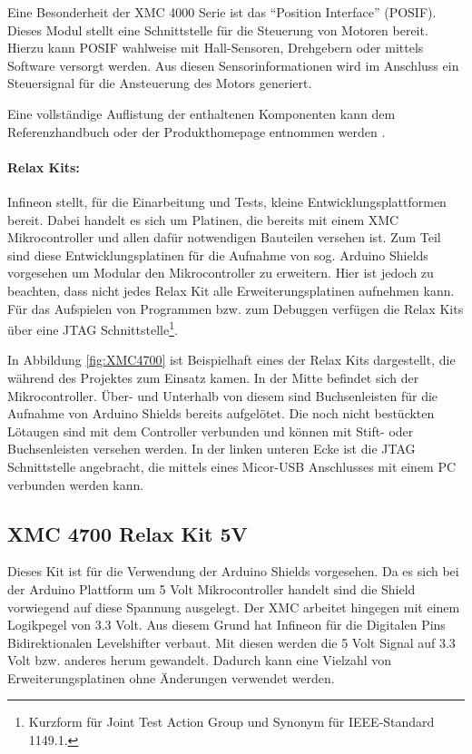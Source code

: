 Eine Besonderheit der XMC 4000 Serie ist das \enquote{Position Interface} (POSIF).
Dieses Modul stellt eine Schnittstelle für die Steuerung von Motoren bereit.
Hierzu kann POSIF wahlweise mit Hall-Sensoren, Drehgebern oder mittels Software versorgt werden.
Aus diesen Sensorinformationen wird im Anschluss ein Steuersignal für die Ansteuerung des Motors generiert.\cite{InfineonTechnologies2016a}

Eine vollständige Auflistung der enthaltenen Komponenten kann dem Referenzhandbuch \cite{InfineonTechnologies2016} oder der Produkthomepage \cite{InfineonTechnologies2017} entnommen werden .

\paragraph{Relax Kits:}
Infineon stellt, für die Einarbeitung und Tests, kleine Entwicklungsplattformen bereit.
Dabei handelt es sich um Platinen, die bereits mit einem XMC Mikrocontroller und allen dafür notwendigen Bauteilen versehen ist.
Zum Teil sind diese Entwicklungsplatinen für die Aufnahme von sog. Arduino Shields vorgesehen um Modular den Mikrocontroller zu erweitern.
Hier ist jedoch zu beachten, dass nicht jedes Relax Kit alle Erweiterungsplatinen aufnehmen kann.
Für das Aufspielen von Programmen bzw. zum Debuggen verfügen die Relax Kits über eine JTAG Schnittstelle\footnote{Kurzform für Joint Test Action Group und Synonym für IEEE-Standard 1149.1.}.

In Abbildung \ref{fig:XMC4700} ist Beispielhaft eines der Relax Kits dargestellt, die während des Projektes zum Einsatz kamen.
In der Mitte befindet sich der Mikrocontroller. 
Über- und Unterhalb von diesem sind Buchsenleisten für die Aufnahme von Arduino Shields bereits aufgelötet.
Die noch nicht bestückten Lötaugen sind mit dem Controller verbunden und können mit Stift- oder Buchsenleisten versehen werden.
In der linken unteren Ecke ist die JTAG Schnittstelle angebracht, die mittels eines Micor-USB Anschlusses mit einem PC verbunden werden kann. 

\subsection{XMC 4700 Relax Kit 5V}
\label{sec:XMC4700}
Dieses Kit ist für die Verwendung der Arduino Shields vorgesehen.
Da es sich bei der Arduino Plattform um 5 Volt Mikrocontroller handelt sind die Shield vorwiegend auf diese Spannung ausgelegt.
Der XMC arbeitet hingegen mit einem Logikpegel von 3.3 Volt.
Aus diesem Grund hat Infineon für die Digitalen Pins Bidirektionalen Levelshifter verbaut.
Mit diesen werden die 5 Volt Signal auf 3.3 Volt bzw. anderes herum gewandelt.
Dadurch kann eine Vielzahl von Erweiterungsplatinen ohne Änderungen verwendet werden.


